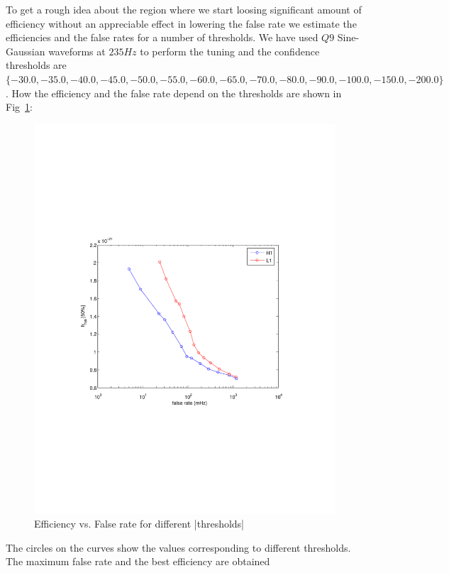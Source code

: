 To get a rough idea about the region where we start loosing significant 
amount of efficiency without an appreciable effect in lowering the false 
rate we estimate the efficiencies and the false rates for a number of 
thresholds. We have used $Q9$ Sine-Gaussian waveforms at $235 Hz $ to
perform the tuning and the confidence thresholds are
$\{-30.0, -35.0, -40.0, -45.0, -50.0, -55.0, -60.0, -65.0, -70.0, -80.0, 
-90.0, -100.0, -150.0, -200.0\}$. How the efficiency and the false rate 
depend on the thresholds are shown in Fig~\ref{fig:dt125df128tune}: 
\begin{figure}[h]
\begin{center}
\includegraphics[width=1.0\textwidth]{figures/H1_L1_dt125_df128}
\caption{Efficiency vs. False rate for different |thresholds|}
\label{fig:dt125df128tune}
\end{center}
\end{figure}
The circles on the curves show the values corresponding to different 
thresholds.  The maximum false rate and the best efficiency are obtained 
